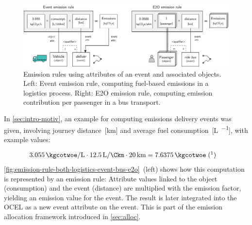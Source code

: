 \begin{figure}[t]
  \begin{small}
    \begin{center}
      \includegraphics[width=\textwidth]{figures/concept/emission-rule-both-logistics-event-bus-e2o.pdf}
    \end{center}
    \caption{Emission rules using attributes of an event and associated objects. Left: Event emission rule, computing fuel-based emissions in a logistics process. Right: E2O emission rule, computing emission contribution per passenger in a bus transport.}
    \label{fig:emission-rule-both-logistics-event-bus-e2o}
  \end{small}
\end{figure}

In \autoref{sec:intro-motiv}, an example for computing emissions delivery events was given,
involving journey distance~[km] and average fuel consumption~[\unit{\liter\per\Ckm}], with example values:

\begin{align*}
	\qty{3.055}{\kgcotwoe\per\liter} \cdot \qty{12.5}{\liter\per\Ckm} \cdot \qty{20}{\km} &= \qty{7.6375}{\kgcotwoe}
  \;(\footnotemark)
\end{align*}
\nopagebreak
{}
%
\autoref{fig:emission-rule-both-logistics-event-bus-e2o}~(left)
shows how this computation is represented by an emission rule:
Attribute values linked to the  object (consumption) and the  event (distance) are multiplied with the emission factor, yielding an emission value for the event.
The result is later integrated into the OCEL as a new event attribute on the  event.
This is part of the emission allocation framework introduced in \autoref{sec:alloc}.

